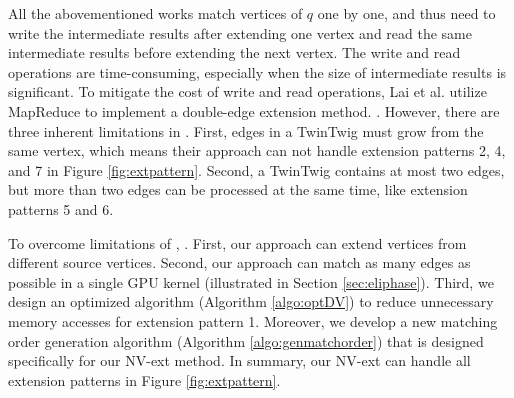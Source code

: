 All the abovementioned works match vertices of $q$ one by one, and thus need to write the intermediate results after extending one vertex and read the same intermediate results before extending the next vertex. The write and read operations are time-consuming, especially when the size of intermediate results is significant. To mitigate the cost of write and read operations, Lai et al. \cite{lai2015scalable} utilize MapReduce to implement a double-edge extension method. . However, there are three inherent limitations in \cite{lai2015scalable}. First, edges in a TwinTwig must grow from the same vertex, which means their approach can not handle extension patterns 2, 4, and 7 in Figure \ref{fig:extpattern}. Second, a TwinTwig contains at most two edges, but more than two edges can be processed at the same time, like extension patterns 5 and 6. 

To overcome limitations of \cite{lai2015scalable}, . First, our approach can extend vertices from different source vertices. Second, our approach can match as many edges as possible in a single GPU kernel (illustrated in Section \ref{sec:eliphase}). Third, we design an optimized algorithm (Algorithm \ref{algo:optDV}) to reduce unnecessary memory accesses for extension pattern 1. Moreover, we develop a new matching order generation algorithm (Algorithm \ref{algo:genmatchorder}) that is designed specifically for our NV-ext method. In summary, our NV-ext can handle all extension patterns in Figure \ref{fig:extpattern}.


